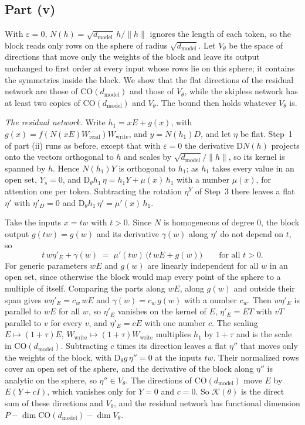 \documentclass[10pt]{article}
\theoremstyle{definition}
\theoremstyle{remark}
\newcommand{\Wread}{W_{\mathrm{read}}}
\newcommand{\Wwrite}{W_{\mathrm{write}}}
\newcommand{\dm}{d_{\mathrm{model}}}
\newcommand{\CO}{\mathrm{CO}}
\newcommand{\Der}{\mathrm{D}}
\newcommand{\norm}[1]{\lVert #1\rVert}
\begin{document}
\subsection*{Part (v)}

With $\varepsilon = 0$, $N(h) = \sqrt{\dm}\,h/\norm{h}$ ignores the length of each token, so the block reads only rows on the sphere of radius $\sqrt{\dm}$. Let $V_\theta$ be the space of directions that move only the weights of the block and leave its output unchanged to first order at every input whose rows lie on this sphere; it contains the symmetries inside the block. We show that the flat directions of the residual network are those of $\CO(\dm)$ and those of $V_\theta$, while the skipless network has at least two copies of $\CO(\dm)$ and $V_\theta$. The bound then holds whatever $V_\theta$ is.

\emph{The residual network.} Write $h_1 = xE + g(x)$, with $g(x) = f(N(xE)\Wread)\Wwrite$, and $y = N(h_1)D$, and let $\eta$ be flat. Step~1 of part (ii) runs as before, except that with $\varepsilon = 0$ the derivative $\Der N(h)$ projects onto the vectors orthogonal to $h$ and scales by $\sqrt{\dm}/\norm{h}$, so its kernel is spanned by $h$. Hence $N(h_1)Y$ is orthogonal to $h_1$; as $h_1$ takes every value in an open set, $Y_s = 0$, and $\Der_\theta h_1\,\eta = h_1Y + \mu(x)\,h_1$ with a number $\mu(x)$, for attention one per token. Subtracting the rotation $\eta^Y$ of Step~3 there leaves a flat $\eta'$ with $\eta'_D = 0$ and $\Der_\theta h_1\,\eta' = \mu'(x)\,h_1$.

Take the inputs $x = tw$ with $t > 0$. Since $N$ is homogeneous of degree $0$, the block output $g(tw) = g(w)$ and its derivative $\gamma(w)$ along $\eta'$ do not depend on $t$, so
\[
t\,w\eta'_E + \gamma(w) \;=\; \mu'(tw)\,\big(t\,wE + g(w)\big)\qquad\text{for all } t > 0.
\]
For generic parameters $wE$ and $g(w)$ are linearly independent for all $w$ in an open set, since otherwise the block would map every point of the sphere to a multiple of itself. Comparing the parts along $wE$, along $g(w)$ and outside their span gives $w\eta'_E = c_w\,wE$ and $\gamma(w) = c_w\,g(w)$ with a number $c_w$. Then $w\eta'_E$ is parallel to $wE$ for all $w$, so $\eta'_E$ vanishes on the kernel of $E$, $\eta'_E = ET$ with $vT$ parallel to $v$ for every $v$, and $\eta'_E = cE$ with one number $c$. The scaling $E \mapsto (1+\tau)E$, $\Wwrite \mapsto (1+\tau)\Wwrite$ multiplies $h_1$ by $1 + \tau$ and is the scale in $\CO(\dm)$. Subtracting $c$ times its direction leaves a flat $\eta''$ that moves only the weights of the block, with $\Der_\theta g\,\eta'' = 0$ at the inputs $tw$. Their normalized rows cover an open set of the sphere, and the derivative of the block along $\eta''$ is analytic on the sphere, so $\eta'' \in V_\theta$. The directions of $\CO(\dm)$ move $E$ by $E(Y + cI)$, which vanishes only for $Y = 0$ and $c = 0$. So $\mathcal K(\theta)$ is the direct sum of these directions and $V_\theta$, and the residual network has functional dimension $P - \dim\CO(\dm) - \dim V_\theta$.
\end{document}
